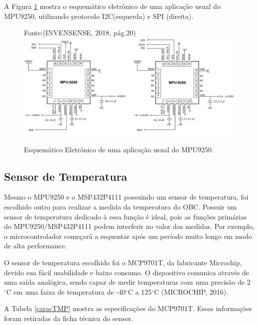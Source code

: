 A Figura \ref{mpu} mostra o esquemático eletrônico de uma aplicação usual do MPU9250, utilizando protocolo I2C(esquerda) e SPI (direita).

\begin{figure}[h]
\footnotesize{	
	\centering
	Fonte:(INVENSENSE, 2018, pág.20)\linebreak
	\includegraphics[keepaspectratio=true,scale=0.4]{figuras/mpu9250.PNG}
	\caption{Esquemático Eletrônico de uma aplicação usual do MPU9250.}	
	\label{mpu}
}
\end{figure}
\FloatBarrier
\subsection{Sensor de Temperatura}

Mesmo o MPU9250 e o MSP432P4111 possuindo um sensor de temperatura, foi escolhido outro para realizar a medida da temperatura do OBC. Possuir um sensor de temperatura dedicado à essa função é ideal, pois as funções primárias do MPU9250/MSP432P4111 podem interferir no valor das medidas. Por exemplo, o microcontrolador começará a esquentar após um período muito longo em modo de alta performance. 

O sensor de temperatura escolhido foi o MCP9701T, da fabricante Microchip, devido sua fácil usabilidade e baixo consumo. O dispositivo comunica através de uma saída analógica, sendo capaz de medir temperaturas com uma precisão de 2 $^{\circ}$C em uma faixa de temperatura de -40$^{\circ}$C a 125$^{\circ}$C (MICROCHIP, 2016).

A Tabela \ref{caracTMP} mostra as especificações do MCP9701T. Essas informações foram retiradas da ficha técnica do sensor.

